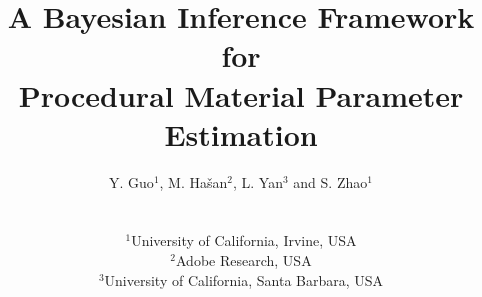 \documentclass{egpubl}
\title[A Bayesian Inference Framework for Procedural Material Parameter Estimation]%
{A Bayesian Inference Framework for \\ Procedural Material Parameter Estimation\\[-0.5cm]}
\author[Y. Guo, M. Ha\v{s}an, L. Yan \& S. Zhao]
{\parbox{\textwidth}{\centering 
		Y. Guo$^1$\orcid{0000-0002-3420-6619}, 
		M. Ha\v{s}an$^2$\orcid{0000-0003-3808-6092},
		L. Yan$^3$ and 
		S. Zhao$^1$\orcid{0000-0003-4759-0514}
		}
	\\
	{\parbox{\textwidth}{\centering
		$^1$University of California, Irvine, USA\\
		$^2$Adobe Research, USA\\
		$^3$University of California, Santa Barbara, USA	
		}
	}
}
\begin{document}
 	
	\maketitle
	\begin{abstract}
		


	\end{abstract}
	
	
	
	
	
	
	
	
	

\end{document}

